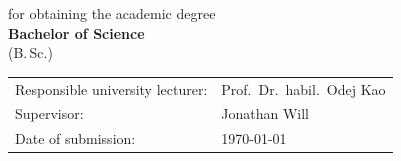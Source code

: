 \documentclass[a4paper,12pt]{article}
\begin{document}
\begin{titlepage}
\begin{center}
\onehalfspacing
for obtaining the academic degree \\
\large \textbf{Bachelor of Science} \\
\normalsize (B.\,Sc.)
\end{center}

\vfill

\onehalfspacing
\begin{tabular}{@{}ll}
Responsible university lecturer: & Prof.\ Dr.\ habil.\ Odej Kao\\
Supervisor: & Jonathan Will\\
Date of submission: & \today
\end{tabular}

\end{titlepage}

\tableofcontents
\newpage









\newpage

\end{document}
